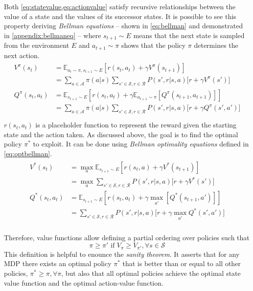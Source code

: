 Both \vref{eq:statevalue,eq:actionvalue} satisfy recursive relationships between the value of a state and the values of its successor states. It is possible to see this property deriving \textit{Bellman equations} \cite{bellman2015applied} -- shown in \vref{eq:bellman} and demonstrated in \vref{appendix:bellmaneq} -- where $s_{t+1}\sim \mathit{E}$ means that the next state is sampled from the environment $E$ and $a_{t+1}\sim \pi$ shows that the policy $\pi$ determines the next action.
\begin{align} \label{eq:bellman}
	\begin{split}
		V^\pi(s_t) &= \mathbb{E}_{a_t \sim \pi, s_{t+1} \sim E}[r(s_t, a_t) + \gamma V^\pi(s_{t+1})] \\
		&= \sum_{a \in \mathcal{A}}\pi(a|s)\sum_{s' \in \mathcal{S}, r \in \mathcal{R}}P(s', r | s, a)\big[r + \gamma V^\pi(s')\big]\\
		Q^\pi(s_t,a_t) &= \mathbb{E}_{s_{t+1} \sim E}[r(s_t, a_t) + \gamma \mathbb{E}_{ a_{t+1} \sim \pi}[Q^\pi(s_{t+1}, a_{t+1})]]\\
		&= \sum_{a \in \mathcal{A}}\pi(a|s)\sum_{s' \in \mathcal{S}, r \in \mathcal{R}}P(s', r | s, a)\big[r + \gamma Q^\pi(s',a')\big]\\
	\end{split}
\end{align}
$r(s_t, a_t)$ is a placeholder function to represent the reward given the starting state and the action taken.
As discussed above, the goal is to find the optimal policy $\pi^*$ to exploit. It can be done using \textit{Bellman optimality equations} defined in \vref{eq:optbellman}.
\begin{align} \label{eq:optbellman}
	\begin{split}
		V^*(s_t) &= \max_{a} \mathbb{E}_{s_{t+1} \sim E}[r(s_t, a) + \gamma V^*(s_{t+1})] \\
		&= \max_{a}\sum_{s' \in \mathcal{S}, r \in \mathcal{R}}P(s', r | s, a)\big[r + \gamma V^*(s')\big]\\
		Q^*(s_t,a_t) &= \mathbb{E}_{s_{t+1} \sim E}[r(s_t, a_t) + \gamma \max_{a'}[Q^*(s_{t+1}, a')]]\\
		&= \sum_{s' \in \mathcal{S}, r \in \mathcal{R}}P(s', r | s, a)\big[r + \gamma \max_{a'} Q^*(s',a')\big]\\
	\end{split}
\end{align}

Therefore, value functions allow defining a partial ordering over policies such that \[\pi \ge \pi' \text{ if } V_\pi \ge V_{\pi'},\forall s \in \mathcal{S}\]
This definition is helpful to enounce the \textit{sanity theorem}. It asserts that for any MDP there exists an optimal policy $\pi^*$ that is better than or equal to all other policies, $\pi^* \ge \pi, \forall \pi$, but also that all optimal policies achieve the optimal state value function and the optimal action-value function.

